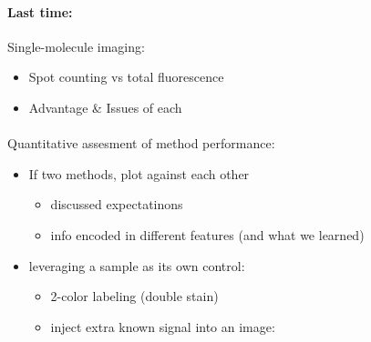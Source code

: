 \documentclass[../main.tex]{subfiles}
\begin{document}
\paragraph*{Last time:} Single-molecule imaging:
\begin{itemize}
    \item Spot counting vs total fluorescence
    \item Advantage \& Issues of each
\end{itemize}
\paragraph*{} Quantitative assesment of method performance:
\begin{itemize}
    \item If two methods, plot against each other
    \begin{itemize}
        \item discussed expectatinons
        \item info encoded in different features (and what we learned)
    \end{itemize}
    \item leveraging a sample as its own control:
    \begin{itemize}
        \item 2-color labeling (double stain)
        \item inject extra known signal into an image: 
    \end{itemize}
\end{itemize}
\end{document}
